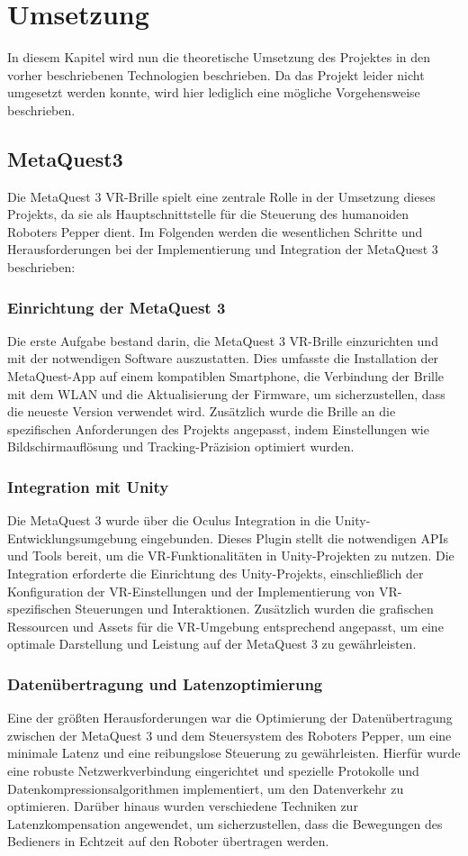 \chapter{Umsetzung}
In diesem Kapitel wird nun die theoretische Umsetzung des Projektes in den vorher beschriebenen Technologien beschrieben. Da das Projekt leider nicht umgesetzt werden konnte, wird hier lediglich eine mögliche Vorgehensweise beschrieben.
\section{MetaQuest3}
Die MetaQuest 3 VR-Brille spielt eine zentrale Rolle in der Umsetzung dieses Projekts, da sie als Hauptschnittstelle für die Steuerung des humanoiden Roboters Pepper dient. Im Folgenden werden die wesentlichen Schritte und Herausforderungen bei der Implementierung und Integration der MetaQuest 3 beschrieben:

\subsection{Einrichtung der MetaQuest 3}
Die erste Aufgabe bestand darin, die MetaQuest 3 VR-Brille einzurichten und mit der notwendigen Software auszustatten. Dies umfasste die Installation der MetaQuest-App auf einem kompatiblen Smartphone, die Verbindung der Brille mit dem WLAN und die Aktualisierung der Firmware, um sicherzustellen, dass die neueste Version verwendet wird. Zusätzlich wurde die Brille an die spezifischen Anforderungen des Projekts angepasst, indem Einstellungen wie Bildschirmauflösung und Tracking-Präzision optimiert wurden.

\subsection{Integration mit Unity}
Die MetaQuest 3 wurde über die Oculus Integration in die Unity-Entwicklungsumgebung eingebunden. Dieses Plugin stellt die notwendigen APIs und Tools bereit, um die VR-Funktionalitäten in Unity-Projekten zu nutzen. Die Integration erforderte die Einrichtung des Unity-Projekts, einschließlich der Konfiguration der VR-Einstellungen und der Implementierung von VR-spezifischen Steuerungen und Interaktionen. Zusätzlich wurden die grafischen Ressourcen und Assets für die VR-Umgebung entsprechend angepasst, um eine optimale Darstellung und Leistung auf der MetaQuest 3 zu gewährleisten.

\subsection{Datenübertragung und Latenzoptimierung}
Eine der größten Herausforderungen war die Optimierung der Datenübertragung zwischen der MetaQuest 3 und dem Steuersystem des Roboters Pepper, um eine minimale Latenz und eine reibungslose Steuerung zu gewährleisten. Hierfür wurde eine robuste Netzwerkverbindung eingerichtet und spezielle Protokolle und Datenkompressionsalgorithmen implementiert, um den Datenverkehr zu optimieren. Darüber hinaus wurden verschiedene Techniken zur Latenzkompensation angewendet, um sicherzustellen, dass die Bewegungen des Bedieners in Echtzeit auf den Roboter übertragen werden.

